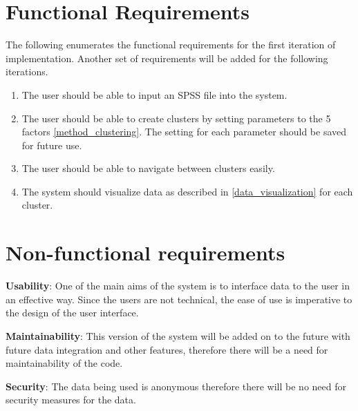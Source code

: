 \section{Functional Requirements}
The following enumerates the functional requirements for the first iteration of implementation. Another set of requirements will be added for the following iterations.
\begin{enumerate}
	\item The user should be able to input an SPSS file into the system.
	\item The user should be able to create clusters by setting parameters to the 5 factors \ref{method_clustering}. The setting for each parameter should be saved for future use.
	\item The user should be able to navigate between clusters easily.
	\item The system should visualize data as described in \ref{data_visualization} for each cluster.
\end{enumerate}

\section{Non-functional requirements}
\textbf{Usability}: One of the main aims of the system is to interface data to the user in an effective way. Since the users are not technical, the ease of use is imperative to the design of the user interface. 

\textbf{Maintainability}: This version of the system will be added on to the future with future data integration and other features, therefore there will be a need for maintainability of the code.

\textbf{Security}: The data being used is anonymous therefore there will be no need for security measures for the data.

